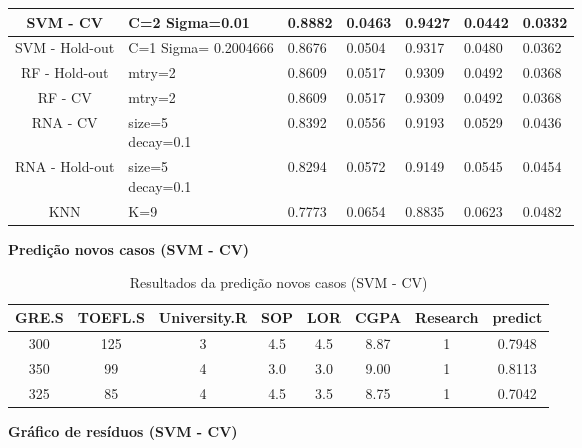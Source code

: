 \begin{table}[H]
\begin{minipage}{\textwidth}
{\begin{tabular}{|c|p{3cm}|p{2cm}|p{2cm}|p{2cm}|p{2cm}|p{2cm}|}
\hline%
\colorbox[HTML]{CAF2C2}{SVM - CV} & C=2 Sigma=0.01 & \colorbox[HTML]{CAF2C2}{0.8882} & \colorbox[HTML]{CAF2C2}{0.0463} & \colorbox[HTML]{CAF2C2}{0.9427} & \colorbox[HTML]{CAF2C2}{0.0442} & \colorbox[HTML]{CAF2C2}{0.0332} \\
\hline
SVM - Hold-out & C=1 Sigma= 0.2004666 & 0.8676 & 0.0504 & 0.9317 & 0.0480 & 0.0362 \\
\hline
RF - Hold-out & mtry=2 & 0.8609 & 0.0517 & 0.9309 & 0.0492 & 0.0368 \\
\hline
RF - CV & mtry=2 & 0.8609 & 0.0517 & 0.9309 & 0.0492 & 0.0368 \\
\hline
RNA - CV & \makecell[l]{size=5\\decay=0.1} & 0.8392 & 0.0556 & 0.9193 & 0.0529 & 0.0436 \\
\hline
RNA - Hold-out & \makecell[l]{size=5\\decay=0.1} & 0.8294 & 0.0572 & 0.9149 & 0.0545 & 0.0454 \\
\hline
KNN & K=9 & 0.7773 & 0.0654 & 0.8835 & 0.0623 & 0.0482 \\
\hline
\end{tabular}
}
\end{minipage}
\end{table}


\begin{center}
    \textbf{Predição novos casos (SVM - CV)}
\end{center}

\begin{table}[H]
\centering
\caption{Resultados da predição novos casos (SVM - CV)}
\begin{tabular}{|c|c|c|c|c|c|c|c|}
\hline
GRE.S & TOEFL.S & University.R & SOP & LOR & CGPA & Research & predict \\
\hline
300 & 125 & 3 & 4.5 & 4.5 & 8.87 & 1 & 0.7948 \\
\hline
350 & 99 & 4 & 3.0 & 3.0 & 9.00 & 1 & 0.8113 \\
\hline
325 & 85 & 4 & 4.5 & 3.5 & 8.75 & 1 & 0.7042 \\
\hline
\end{tabular}
\end{table}


\begin{center}
    \textbf{Gráfico de resíduos (SVM - CV)}
\end{center}

